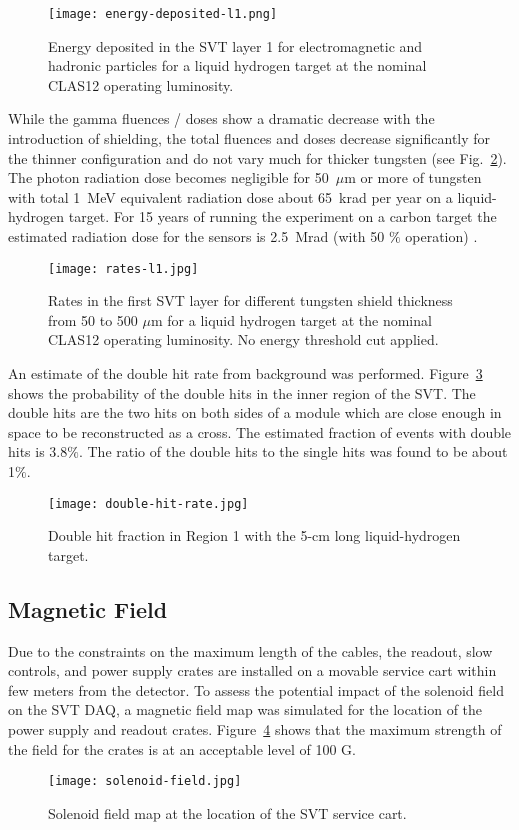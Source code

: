\begin{figure}[hbt] 
\centering 
\texttt{[image: energy-deposited-l1.png]}
\caption{Energy deposited in the SVT layer 1 for electromagnetic and hadronic particles for a liquid hydrogen target at the nominal CLAS12 operating luminosity.}
\label{fig:energy-deposited-l1}
\end{figure}

While the gamma fluences / doses show a dramatic decrease with the introduction of shielding, the total fluences and doses decrease significantly for the thinner configuration and do not vary much for thicker tungsten (see Fig.~\ref{fig:rates-l1}). The photon radiation dose becomes negligible for 50~$\mu$m or more of tungsten with total 1~MeV equivalent radiation dose about 65~krad per year on a liquid-hydrogen target. For 15 years of running the experiment on a carbon target the estimated radiation dose for the sensors is 2.5~Mrad (with 50 $\%$ operation) \cite{TDRSVT}. 

\begin{figure}[hbt] 
\centering 
\texttt{[image: rates-l1.jpg]}
\caption{Rates in the first SVT layer for different tungsten shield thickness from 50 to 500 $\mu$m for a liquid hydrogen target at the nominal CLAS12 operating luminosity. No energy threshold cut applied.}
\label{fig:rates-l1}
\end{figure}

An estimate of the double hit rate from background was performed. Figure~\ref{fig:double-hit-rate} shows the probability of the double hits in the inner region of the SVT. The double hits are the two hits on both sides of a module which are close enough in space to be reconstructed as a cross. The estimated fraction of events with double hits is 3.8$\%$. The ratio of the double hits to the single hits was found to be about 1$\%$.

\begin{figure}[hbt] 
\centering 
\texttt{[image: double-hit-rate.jpg]}
\caption{Double hit fraction in Region 1 with the 5-cm long liquid-hydrogen target.}
\label{fig:double-hit-rate}
\end{figure}

\subsection{Magnetic Field}

Due to the constraints on the maximum length of the cables, the readout, slow controls, and power supply crates are installed on a movable service cart within few meters from the detector. To assess the potential impact of the solenoid field on the SVT DAQ, a magnetic field map was simulated for the location of the power supply and readout crates. Figure~\ref{fig:solenoid-field} shows that the maximum strength of the field for the crates is at an acceptable level of 100 G.

\begin{figure}[hbt] 
\centering 
\texttt{[image: solenoid-field.jpg]}
\caption{Solenoid field map at the location of the SVT service cart.}
\label{fig:solenoid-field}
\end{figure}



